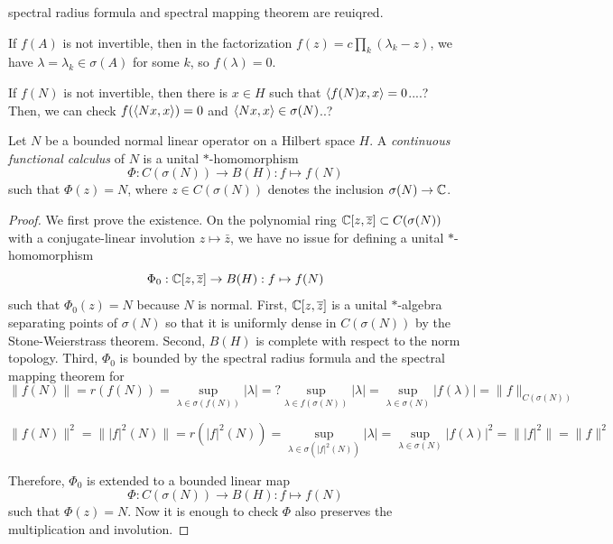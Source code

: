 \documentclass{../../large}
\begin{document}


spectral radius formula and spectral mapping theorem are reuiqred.






\begin{prb}
\end{prb}

\begin{prb}

If $f(A)$ is not invertible, then in the factorization $f(z)=c\prod_k(\lambda_k-z)$, we have $\lambda=\lambda_k\in\sigma(A)$ for some $k$, so $f(\lambda)=0$.

If $f(N)$ is not invertible, then there is $x\in H$ such that $\langle f(N)x,x\rangle=0$....?
Then, we can check $f(\langle Nx,x\rangle)=0$ and $\langle Nx,x\rangle\in\sigma(N)$..?






\end{prb}





\begin{prb}
Let $N$ be a bounded normal linear operator on a Hilbert space $H$.
A \emph{continuous functional calculus} of $N$ is a unital $*$-homomorphism
\[\Phi:C(\sigma(N))\to B(H):f\mapsto f(N)\]
such that $\Phi(z)=N$, where $z\in C(\sigma(N))$ denotes the inclusion $\sigma(N)\to\mathbb{C}$.
\end{prb}
\begin{proof}

We first prove the existence.
On the polynomial ring $\mathbb{C}[z,\overline z]\subset C(\sigma(N))$ with a conjugate-linear involution $z\mapsto\bar z$, we have no issue for defining a unital $*$-homomorphism
\[\Phi_0:\mathbb{C}[z,\overline z]\to B(H):f\mapsto f(N)\]
such that $\Phi_0(z)=N$ because $N$ is normal.
First, $\mathbb{C}[z,\overline z]$ is a unital $*$-algebra separating points of $\sigma(N)$ so that it is uniformly dense in $C(\sigma(N))$ by the Stone-Weierstrass theorem.
Second, $B(H)$ is complete with respect to the norm topology.
Third, $\Phi_0$ is bounded by the spectral radius formula and the spectral mapping theorem for 
\[\|f(N)\|=r(f(N))=\sup_{\lambda\in\sigma(f(N))}|\lambda|=?\sup_{\lambda\in f(\sigma(N))}|\lambda|=\sup_{\lambda\in\sigma(N)}|f(\lambda)|=\|f\|_{C(\sigma(N))}\]

\[\|f(N)\|^2=\||f|^2(N)\|=r(|f|^2(N))=\sup_{\lambda\in\sigma(|f|^2(N))}|\lambda|=\sup_{\lambda\in\sigma(N)}|f(\lambda)|^2=\||f|^2\|=\|f\|^2\]


Therefore, $\Phi_0$ is extended to a bounded linear map
\[\Phi:C(\sigma(N))\to B(H):f\mapsto f(N)\]
such that $\Phi(z)=N$.
Now it is enough to check $\Phi$ also preserves the multiplication and involution.



\end{proof}
\end{document}
